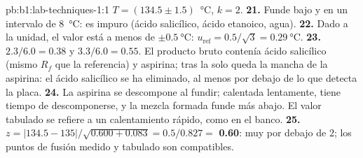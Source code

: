 \begin{solution}{pb:b1:lab-techniques-1:1}
$T = (134.5 \pm 1.5)$~\unit{\celsius}, $k = 2$.
\textbf{21.} Funde bajo y en un intervalo de \qty{8}{\celsius}: es impuro
(ácido salicílico, ácido etanoico, agua).
\textbf{22.} Dado a la unidad, el valor está a menos de
$\pm\qty{0.5}{\celsius}$: $u_{\mathrm{ref}} = 0.5/\sqrt3 = \qty{0.29}{\celsius}$.
\textbf{23.} $2.3/6.0 = 0.38$ y $3.3/6.0 = 0.55$. El producto bruto
contenía ácido salicílico (mismo $R_f$ que la referencia) y aspirina; tras
la  solo queda la mancha de la aspirina: el ácido
salicílico se ha eliminado, al menos por debajo de lo que detecta la
placa.
\textbf{24.} La aspirina se descompone al fundir; calentada lentamente,
tiene tiempo de descomponerse, y la mezcla formada funde más abajo. El
valor tabulado se refiere a un calentamiento rápido, como en el banco.
\textbf{25.} $z = |134.5 - 135|/\sqrt{0.600 + 0.083} = 0.5/0.827 =$
\textbf{0.60}: muy por debajo de 2; los puntos de fusión medido y
tabulado son compatibles.
\end{solution}
